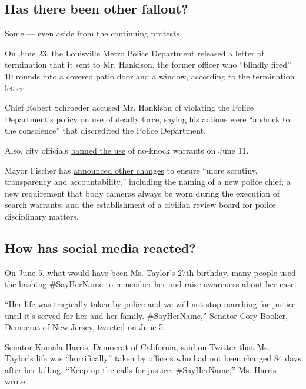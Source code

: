 \hypertarget{has-there-been-other-fallout}{%
\subsection{Has there been other
fallout?}\label{has-there-been-other-fallout}}

Some --- even aside from the continuing protests.

On June 23, the Louisville Metro Police Department released a letter of
termination that it sent to Mr. Hankison, the former officer who
``blindly fired'' 10 rounds into a covered patio door and a window,
according to the termination letter.

Chief Robert Schroeder accused Mr. Hankison of violating the Police
Department's policy on use of deadly force, saying his actions were ``a
shock to the conscience'' that discredited the Police Department.

Also, city officials
\href{https://www.nytimes3xbfgragh.onion/2020/06/12/us/breonna-taylor-law-passed.html}{banned
the use} of no-knock warrants on June 11.

Mayor Fischer has
\href{https://www.wlky.com/article/following-protests-louisville-mayor-puts-end-to-no-knock-warrants-for-now/32711443}{announced
other changes} to ensure ``more scrutiny, transparency and
accountability,'' including the naming of a new police chief; a new
requirement that body cameras always be worn during the execution of
search warrants; and the establishment of a civilian review board for
police disciplinary matters.

\hypertarget{how-has-social-media-reacted}{%
\subsection{How has social media
reacted?}\label{how-has-social-media-reacted}}

On June 5, what would have been Ms. Taylor's 27th birthday, many people
used the hashtag \#SayHerName to remember her and raise awareness about
her case.

``Her life was tragically taken by police and we will not stop marching
for justice until it's served for her and her family. \#SayHerName,''
Senator Cory Booker, Democrat of New Jersey,
\href{https://twitter.com/CoryBooker/status/1268961372836188163}{tweeted
on June 5}.

Senator Kamala Harris, Democrat of California,
\href{https://twitter.com/KamalaHarris/status/1268905322837692428}{said
on Twitter} that Ms. Taylor's life was ``horrifically'' taken by
officers who had not been charged 84 days after her killing. ``Keep up
the calls for justice. \#SayHerName,'' Ms. Harris wrote.

